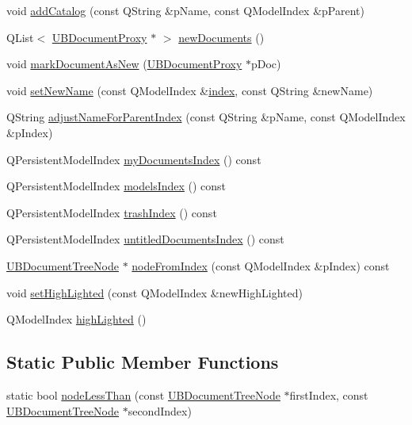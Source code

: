 \begin{DoxyCompactItemize}
\item 
void \hyperlink{class_u_b_document_tree_model_a2ad046b847b973f923ad335939d79b33}{add\-Catalog} (const Q\-String \&p\-Name, const Q\-Model\-Index \&p\-Parent)
\item 
Q\-List$<$ \hyperlink{class_u_b_document_proxy}{U\-B\-Document\-Proxy} $\ast$ $>$ \hyperlink{class_u_b_document_tree_model_a7103269c237a7b6bfeba14b7e8cdfee3}{new\-Documents} ()
\item 
void \hyperlink{class_u_b_document_tree_model_a52f01503640b7e55146e197b91f8068e}{mark\-Document\-As\-New} (\hyperlink{class_u_b_document_proxy}{U\-B\-Document\-Proxy} $\ast$p\-Doc)
\item 
void \hyperlink{class_u_b_document_tree_model_ae57b2048ad6889dd3928df266a1a7449}{set\-New\-Name} (const Q\-Model\-Index \&\hyperlink{class_u_b_document_tree_model_a482d152ef1865a960d12f7d8726133b9}{index}, const Q\-String \&new\-Name)
\item 
Q\-String \hyperlink{class_u_b_document_tree_model_aa08a2244960857a0835f7feb0fdfc757}{adjust\-Name\-For\-Parent\-Index} (const Q\-String \&p\-Name, const Q\-Model\-Index \&p\-Index)
\item 
Q\-Persistent\-Model\-Index \hyperlink{class_u_b_document_tree_model_a3a765b9011251b3a9540412eac4b90f0}{my\-Documents\-Index} () const 
\item 
Q\-Persistent\-Model\-Index \hyperlink{class_u_b_document_tree_model_a4e4fcf3c71fdb7a747d171ce6159717f}{models\-Index} () const 
\item 
Q\-Persistent\-Model\-Index \hyperlink{class_u_b_document_tree_model_a4e40cf280fea5a6c98f89e7a7d4e5871}{trash\-Index} () const 
\item 
Q\-Persistent\-Model\-Index \hyperlink{class_u_b_document_tree_model_a3c301d6faa90617b061ef7e99bbf6ef2}{untitled\-Documents\-Index} () const 
\item 
\hyperlink{class_u_b_document_tree_node}{U\-B\-Document\-Tree\-Node} $\ast$ \hyperlink{class_u_b_document_tree_model_a09f526b235ed26f15429775ae8c9b08d}{node\-From\-Index} (const Q\-Model\-Index \&p\-Index) const 
\item 
void \hyperlink{class_u_b_document_tree_model_adb81ee375f8b5f9007723e4adaadd176}{set\-High\-Lighted} (const Q\-Model\-Index \&new\-High\-Lighted)
\item 
Q\-Model\-Index \hyperlink{class_u_b_document_tree_model_aeaf526310dac34869e1b093edfd2ae73}{high\-Lighted} ()
\end{DoxyCompactItemize}
\subsection*{Static Public Member Functions}
\begin{DoxyCompactItemize}
\item 
static bool \hyperlink{class_u_b_document_tree_model_a75608e2e56549790f922c4e5ce41866d}{node\-Less\-Than} (const \hyperlink{class_u_b_document_tree_node}{U\-B\-Document\-Tree\-Node} $\ast$first\-Index, const \hyperlink{class_u_b_document_tree_node}{U\-B\-Document\-Tree\-Node} $\ast$second\-Index)
\end{DoxyCompactItemize}


